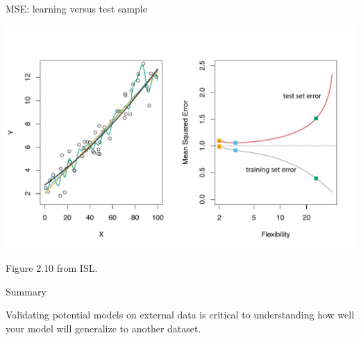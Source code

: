 \documentclass[table]{beamer}\usepackage[]{graphicx}\usepackage[]{color}
\begin{document}
\begin{frame}{MSE: learning versus test sample}
\centerline{
\includegraphics[scale=.6,angle=0]{figure-static/2_10.pdf}
}
Figure 2.10 from ISL.

\end{frame}


\begin{frame}{Summary}

Validating potential models on external data is critical to understanding how well your model will generalize to another dataset.

\end{frame}
\end{document}
